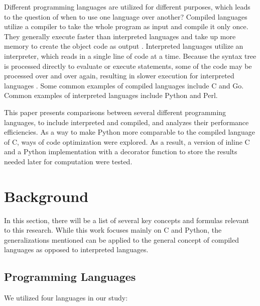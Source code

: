 \documentclass{sig-alternate}
\begin{document}
Different programming languages are utilized for different purposes, which leads to the question of when to use one language over another? Compiled languages utilize a compiler to take the whole program as input and compile it only once. They generally execute faster than interpreted languages and take up more memory to create the object code as output \cite{languages}. Interpreted languages utilize an interpreter, which reads in a single line of code at a time. Because the syntax tree is processed directly to evaluate or execute statements, some of the code may be processed over and over again, resulting in slower execution for interpreted languages \cite{languages}. Some common examples of compiled languages include C and Go. Common examples of interpreted languages include Python and Perl. 

This paper presents comparisons between several different programming languages, to include interpreted and compiled, and analyzes their performance efficiencies. As a way to make Python more comparable to the compiled language of C, ways of code optimization were explored. As a result, a version of inline C and a Python implementation with a decorator function to store the results needed later for computation were tested.

\section{Background}

In this section, there will be a list of several key concepts and formulas relevant to this research. While this work focuses mainly on C and Python, the generalizations mentioned can be applied to the general concept of compiled languages as opposed to interpreted languages. 

\subsection{Programming Languages}	

We utilized four languages in our study:
\end{document}
